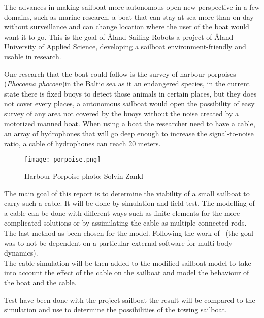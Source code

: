 The advances in making sailboat more autonomous open new perspective in a few domains, such as marine research, a boat that can stay at sea more than on day without surveillance and can change location where the user of the boat would want it to go. This is the goal of \r{A}land Sailing Robots a project of \r{A}land University of Applied Science, developing a sailboat environment-friendly and usable in research.

One research that the boat could follow is the survey of harbour porpoises (\textit{Phocoena phocoen})in the Baltic sea as it an endangered species, in the current state there is fixed buoys to detect those animals in certain places,  but they does not cover every places, a autonomous sailboat would open the possibility of easy survey of any area not covered by the buoys without the noise created by a motorized manned boat.
When using a boat the researcher need to have a cable, an array of hydrophones that will go deep enough to increase the signal-to-noise ratio, a cable of hydrophones can reach 20 meters.

\begin{figure}[H]
\centering
    \texttt{[image: porpoise.png]}
    \caption[Caption for LOF]{Harbour Porpoise  photo: Solvin Zankl }
    \label{fig:porpoise}
\end{figure}

The main goal of this report is to determine the viability of a small sailboat to carry such a cable. It will be done by simulation and field test. The modelling of a cable can be done with different ways such as finite elements for the more complicated solutions or by assimilating the cable as multiple connected rods. The last method as been chosen for the model. Following the work of~\cite{johansen2007modelling} (the goal was to not be dependent on a particular external software for multi-body dynamics).\\
The cable simulation will be then added to the modified sailboat model to take into account the effect of
the cable on the sailboat and model the behaviour of the boat and the cable.

Test have been done with the project sailboat the result will be compared to the simulation and use to determine the possibilities of the towing sailboat.

